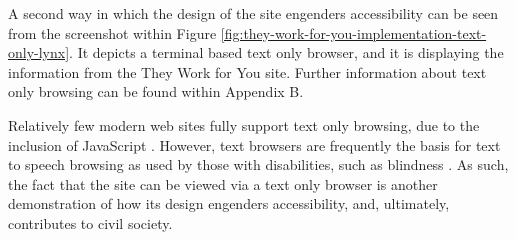 A second way in which the design of the site engenders accessibility can be seen from the screenshot within Figure \ref{fig:they-work-for-you-implementation-text-only-lynx}.
It depicts a terminal based text only browser, and it is displaying the information from the They Work for You site.
Further information about text only browsing can be found within Appendix B.

Relatively few modern web sites fully support text only browsing, due to the inclusion of  JavaScript \cite{web-2.0-technologies}.
However, text browsers are frequently the basis for text to speech browsing as used by those with disabilities, such as blindness \cite{shelter-guide-web-accessibility}.
As such, the fact that the site can be viewed via a text only browser is another demonstration of how its design engenders accessibility, and, ultimately, contributes to civil society.
